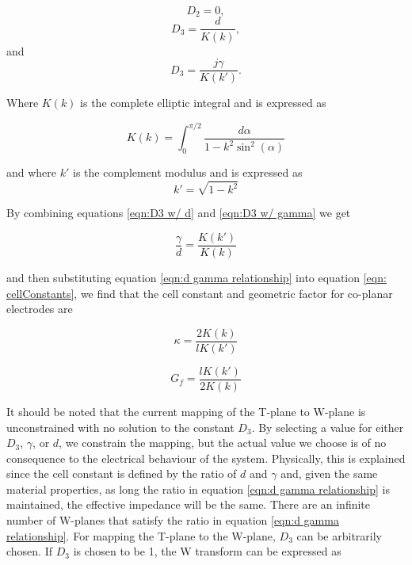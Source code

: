 \begin{equation}
     D_2 = 0,
 \end{equation}
 \begin{equation}
     D_3 = \frac{d}{K(k)},
     \label{eqn:D3 w/ d}
 \end{equation}
\noindent and
\begin{equation}
    D_3 = \frac{j\gamma}{K(k')}.
    \label{eqn:D3 w/ gamma}
\end{equation}

\noindent Where $K(k)$ is the complete elliptic integral and is expressed as 

 \begin{equation}
     K(k) = \int_0^{\pi/2} \frac{d\alpha}{1 - k^2\sin^2(\alpha)}
 \end{equation}
 
 \noindent and where $k'$ is the complement modulus and is expressed as 
 \begin{equation}
     k' = \sqrt{1-k^2}
 \end{equation}

\noindent By combining equations \ref{eqn:D3 w/ d} and \ref{eqn:D3 w/ gamma} we get

\begin{equation}
    \frac{\gamma}{d} = \frac{K(k')}{K(k)}
    \label{eqn:d gamma relationship}
\end{equation}

\noindent and then substituting equation \ref{eqn:d gamma relationship} into equation \ref{eqn: cellConstants}, we find that the cell constant and geometric factor for co-planar electrodes are 

\begin{equation}
    \kappa = \frac{2K(k)}{lK(k')}
    \label{eqn: cellConstantSolution}
\end{equation}

\begin{equation}
    G_f = \frac{lK(k')}{2K(k)}
\end{equation}

\par It should be noted that the current mapping of the T-plane to W-plane is unconstrained with no solution to the constant $D_3$. By selecting a value for either $D_3$, $\gamma$, or $d$, we constrain the mapping, but the actual value we choose is of no consequence to the electrical behaviour of the system. Physically, this is explained since the cell constant is defined by the ratio of $d$ and $\gamma$ and, given the same material properties, as long the ratio in equation \ref{eqn:d gamma relationship} is maintained, the effective impedance will be the same. There are an infinite number of W-planes that satisfy the ratio in equation \ref{eqn:d gamma relationship}. For mapping the T-plane to the W-plane, $D_3$ can be arbitrarily chosen. If $D_3$ is chosen to be 1, the W transform can be expressed as 

